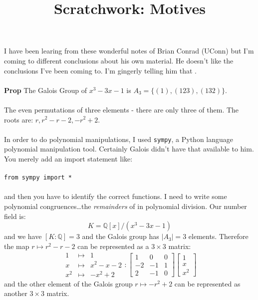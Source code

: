 \documentclass[12pt]{article}
\title{Scratchwork: Motives}
\date{}
\begin{document}

\sffamily

\maketitle

\noindent I have been learing from these wonderful notes of Brian Conrad (UConn) but I'm coming to different conclusions about his own material.  He doesn't like the conclusions I've been coming to.  I'm gingerly telling him that . \\ \\
\textbf{Prop} The Galois Group of $x^3 - 3x - 1$ is $A_3 = \{ (1),(123),(132) \} $. \\ \\
The even permutations of three elements - there are only three of them.  The roots are: $r, r^2 - r - 2, -r^2 + 2$. \\ \\
In order to do polynomial manipulations, I used \texttt{sympy}, a Python language polynomial manipulation tool.  Certainly Galois didn't have that available to him.   You merely add an import statement like: \\ \\
\texttt{from sympy import *} \\ \\
and then you have to identify the correct functions.  I need to write some polynomial congruences\dots the \textit{remainders} of in polynomial division. Our number field is:
$$ K = \mathbb{Q}[x]/(x^3 - 3x - 1)$$ 
and we have $[K:\mathbb{Q}] = 3$ and the Galois group has $|A_3|= 3$ elements.  Therefore the map $r \mapsto r^2 - r - 2$ can be represented as a $3 \times 3$ matrix:
$$\begin{array}{ccccc}
1 & \mapsto & 1 \\
x & \mapsto & x^2 - x - 2 \\
x^2 & \mapsto & - x^2 + 2
\end{array}  :
\left[ 
\begin{array}{rrr} 1 &  0 & 0 \\
-2 & -1 & 1 \\ 2 & -1 & 0\end{array}\right]
\left[ \begin{array}{l} 1 \\ x \\ x^2 \end{array}\right]$$
and the other element of the Galois group $r \mapsto - r^2 + 2$ can be represented as another $3 \times 3$ matrix.
\end{document}
